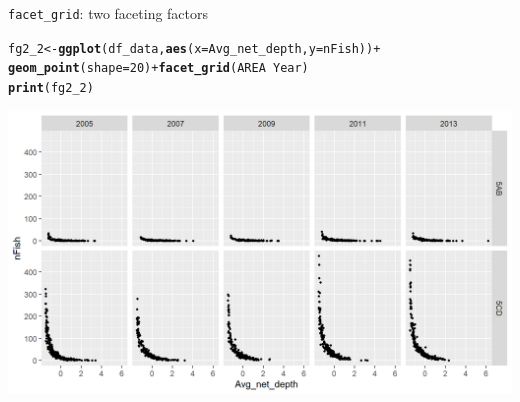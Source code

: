 \documentclass{beamer}\usepackage[]{graphicx}\usepackage[]{color}
\makeatletter
\newcommand{\hlnum}[1]{\textcolor[rgb]{0.686,0.059,0.569}{#1}}%
\newcommand{\hlopt}[1]{\textcolor[rgb]{0,0,0}{#1}}%
\newcommand{\hlstd}[1]{\textcolor[rgb]{0.345,0.345,0.345}{#1}}%
\newcommand{\hlkwb}[1]{\textcolor[rgb]{0.69,0.353,0.396}{#1}}%
\newcommand{\hlkwc}[1]{\textcolor[rgb]{0.333,0.667,0.333}{#1}}%
\newcommand{\hlkwd}[1]{\textcolor[rgb]{0.737,0.353,0.396}{\textbf{#1}}}%
\newenvironment{kframe}{%
 \def\at@end@of@kframe{}%
 \ifinner\ifhmode%
  \def\at@end@of@kframe{\end{minipage}}%
  \begin{minipage}{\columnwidth}%
 \fi\fi%
 \def\FrameCommand##1{\hskip\@totalleftmargin \hskip-\fboxsep
 \colorbox{shadecolor}{##1}\hskip-\fboxsep
     \hskip-\linewidth \hskip-\@totalleftmargin \hskip\columnwidth}%
 \MakeFramed {\advance\hsize-\width
   \@totalleftmargin\z@ \linewidth\hsize
   \@setminipage}}%
 {\par\unskip\endMakeFramed%
 \at@end@of@kframe}
\newenvironment{knitrout}{}{} %
\makeatother
\begin{document}
\begin{frame}[fragile]{\lstinline{facet_grid}: two faceting factors}
\begin{knitrout}\footnotesize
{}\color{fgcolor}\begin{kframe}
\begin{alltt}
\hlstd{fg2_2} \hlkwb{<-} \hlkwd{ggplot}\hlstd{(df_data,} \hlkwd{aes}\hlstd{(}\hlkwc{x}\hlstd{=Avg_net_depth,} \hlkwc{y}\hlstd{=nFish))} \hlopt{+}
  \hlkwd{geom_point}\hlstd{(}\hlkwc{shape}\hlstd{=}\hlnum{20}\hlstd{)} \hlopt{+} \hlkwd{facet_grid}\hlstd{(AREA} \hlopt{~} \hlstd{Year)}
\hlkwd{print}\hlstd{(fg2_2)}
\end{alltt}
\end{kframe}

{\centering \includegraphics[width=.9\linewidth]{figure/facet_grid_5-1} 

}



\end{knitrout}
\end{frame}
\end{document}
